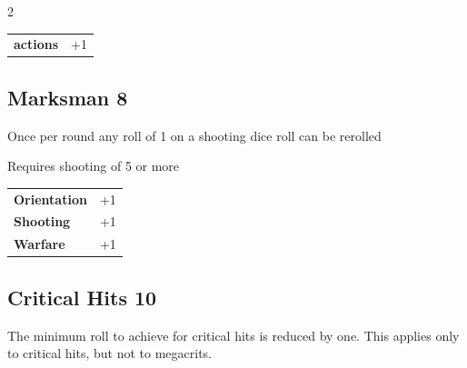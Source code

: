 \begin{multicols}{2}
\begin{tcolorbox}
\vspace{3mm}

\begin{tabular}{@{}ll@{}}
    \textbf{actions} & +1\\
\end{tabular}


\end{tcolorbox}

\begin{tcolorbox}
    \subsection*{Marksman \hfill \small{8 }}
    \tcblower
Once per round any roll of 1 on a shooting dice roll can be rerolled

Requires shooting of 5 or more


\vspace{3mm}

\begin{tabular}{@{}ll@{}}
    \textbf{Orientation} & +1\\
    \textbf{Shooting} & +1\\
    \textbf{Warfare} & +1\\
\end{tabular}


\end{tcolorbox}

\begin{tcolorbox}
    \subsection*{Critical Hits \hfill \small{10 }}
    \tcblower
The minimum roll to achieve for critical hits is reduced by one. This applies only to critical hits, but not to megacrits.


\vspace{3mm}



\end{tcolorbox}


\end{multicols}
